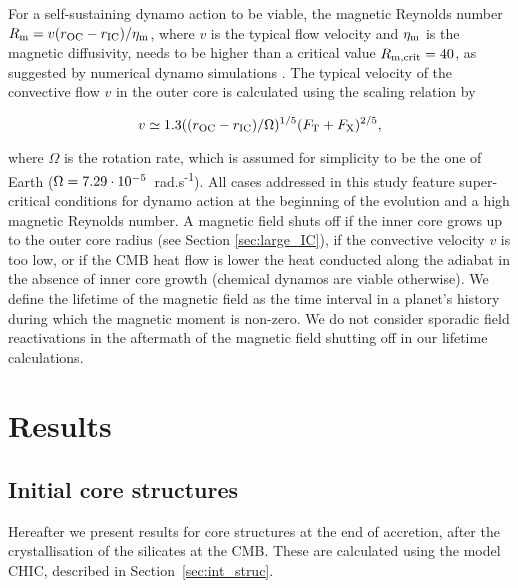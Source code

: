 \documentclass[draft]{agujournal2019} %
\begin{document}
For a self-sustaining dynamo action to be viable, the magnetic Reynolds number $R_{\rm m} =v(r_{\rm OC}-r_{\rm IC})/\eta_{\rm m}$, where $v$ is the typical flow velocity and $\eta_{\rm m}$ is the magnetic diffusivity, needs to be higher than a critical value $R_{\rm m,crit}=40$, as suggested by numerical dynamo simulations \cite{christensen2006scaling,roberts2015theory}. The typical velocity of the convective flow $v$ in the outer core is calculated using the scaling relation by  
\begin{linenomath*} 
\begin{equation}
    v \simeq 1.3((r_{\rm OC}-r_{\rm IC}) / \Omega)^{1 / 5} (F_{\rm T}+F_{\rm X})^{2 / 5},
\end{equation}
\end{linenomath*}
where $\Omega$ is the rotation rate, which is assumed for simplicity to be the one of Earth ($\Omega = 7.29 \cdot 10^{\rm -5}$~rad.s\textsuperscript{-1}). All cases addressed in this study feature super-critical conditions for dynamo action at the beginning of the evolution and a high magnetic Reynolds number. A magnetic field shuts off if the inner core grows up to the outer core radius (see Section \ref{sec:large_IC}), if the convective velocity $v$ is too low, or if the CMB heat flow is lower the heat conducted along the adiabat in the absence of inner core growth (chemical dynamos are viable otherwise). We define the lifetime of the magnetic field as the time interval in a planet's history during which the magnetic moment is non-zero. We do not consider sporadic field reactivations in the aftermath of the magnetic field shutting off in our lifetime calculations.

\section{Results} \label{sec:results}

\subsection{Initial core structures}\label{sec:res_structure}
Hereafter we present results for core structures at the end of accretion, after the crystallisation of the silicates at the CMB. These are calculated using the model CHIC, described in Section~\ref{sec:int_struc}.
\end{document}
